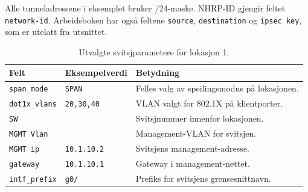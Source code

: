 \noindent
Alle tunneladressene i eksemplet bruker /24-maske. NHRP-ID gjengir feltet
\texttt{network-id}. Arbeidsboken har også feltene \texttt{source},
\texttt{destination} og \texttt{ipsec key}, som er utelatt fra utsnittet.

\begin{table}[H]
    \centering
    \caption{Utvalgte svitsjparametere for lokasjon 1.}
    \label{tab:excel-svitsj}
    \small
    \renewcommand{\arraystretch}{1.35}
    \setlength{\tabcolsep}{5pt}
    \begin{tabular}{
        >{\raggedright\arraybackslash}p{3.6cm}
        >{\raggedright\arraybackslash}p{2.8cm}
        >{\raggedright\arraybackslash}p{8.0cm}
    }
        \toprule
        \rowcolor{tablegreen}
        \color{white}\textbf{Felt} &
        \color{white}\textbf{Eksempelverdi} &
        \color{white}\textbf{Betydning} \\
        \midrule
        \texttt{span\_mode} & \texttt{SPAN} & Felles valg av speilingsmodus på lokasjonen. \\
        \texttt{dot1x\_vlans} & \texttt{20,30,40} & VLAN valgt for 802.1X på klientporter. \\
        \texttt{SW} & 1 & Svitsjnummer innenfor lokasjonen. \\
        \texttt{MGMT Vlan} & 10 & Management-VLAN for svitsjen. \\
        \texttt{MGMT ip} & \texttt{10.1.10.2} & Svitsjens management-adresse. \\
        \texttt{gateway} & \texttt{10.1.10.1} & Gateway i management-nettet. \\
        \texttt{intf\_prefix} & \texttt{g0/} & Prefiks for svitsjens grensesnittnavn. \\
        \bottomrule
    \end{tabular}
\end{table}

